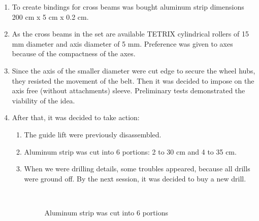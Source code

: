 \begin{enumerate}
\begin{enumerate}
      \item  To create bindings for cross beams was bought aluminum strip dimensions 200 cm x 5 cm x 0.2 cm.
      
      \item As the cross beams in the set are available TETRIX cylindrical rollers of 15 mm diameter and axis diameter of 5 mm. Preference was given to axes because of the compactness of the axes.
       
      \item Since the axis of the smaller diameter were cut edge to secure the wheel hubs, they resisted the movement of the belt. Then it was decided to impose on the axis free (without attachments) sleeve. Preliminary tests demonstrated the viability of the idea.
        
      \item After that, it was decided to take action:
      \begin{enumerate}
      	\item The guide lift were previously disassembled.
      	
      	\item  Aluminum strip was cut into 6 portions: 2 to 30 cm and 4 to 35 cm.
      	
      	\item When we were drilling details, some troubles appeared, because all drills were ground off. By the next session, it was decided to buy a new drill.
      	
      	\begin{figure}[H]
      		\begin{minipage}[h]{0.2\linewidth}
      			\center  
      		\end{minipage}
      		\begin{minipage}[h]{0.6\linewidth}
      			\caption{Aluminum strip was cut into 6 portions}
      		\end{minipage}
      	\end{figure}
      	

\end{enumerate}
\end{enumerate}
\end{enumerate}
